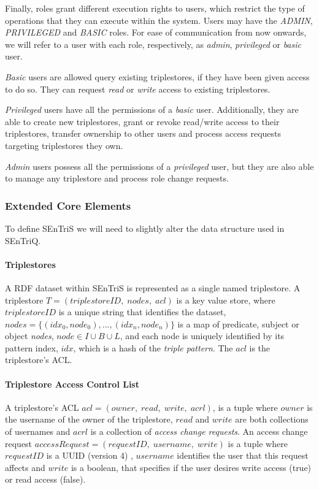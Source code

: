 Finally, roles grant different execution rights to users, which restrict the type of operations that they can execute within the system. Users may have the \emph{ADMIN}, \emph{PRIVILEGED} and \emph{BASIC} roles. For ease of communication from now onwards, we will refer to a user with each role, respectively, as \emph{admin}, \emph{privileged} or \emph{basic} user.

\emph{Basic} users are allowed query existing triplestores, if they have been given access to do so. They can request \emph{read} or \emph{write} access to existing triplestores.

\emph{Privileged} users have all the permissions of a \emph{basic} user. Additionally, they are able to create new triplestores, grant or revoke read/write access to their triplestores, transfer ownership to other users and process access requests targeting triplestores they own.

\emph{Admin} users possess all the permissions of a \emph{privileged} user, but they are also able to manage any triplestore and process role change requests.

\subsubsection*{Extended Core Elements}
To define \gls{SEnTriS} we will need to slightly alter the data structure used in \gls{SEnTriQ}. 

\paragraph*{Triplestores} A \gls{RDF} dataset within \gls{SEnTriS} is represented as a single named triplestore. A triplestore $T = (triplestoreID,\; nodes, \; acl)$ is a key value store, where $triplestoreID$ is a unique string that identifies the dataset, $nodes = \{(idx_{0}, node_{0}), ... ,(idx_{n},\allowbreak node_{n})\}$ is a map of predicate, subject or object \emph{nodes}, $node \in I \cup B \cup L$, and each node is uniquely identified by its pattern index, $idx$, which is a hash of the \emph{triple pattern}. The $acl$ is the triplestore's \gls{ACL}.

\paragraph*{Triplestore Access Control List} A triplestore's \gls{ACL} $acl = (owner, \; read,\; write,\; acrl)$, is a tuple where $owner$ is the username of the owner of the triplestore, $read$ and $write$ are both collections of usernames and $acrl$ is a collection of \emph{access change requests}. An access change request $accessRequest = (requestID, \; username, \; write)$ is a tuple where $requestID$ is a \gls{UUID} (version 4) \autocite{Leach2005-rf}, $username$ identifies the user that this request affects and $write$ is a boolean, that specifies if the user desires write access (true) or read access (false).

